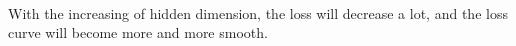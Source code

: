 \documentclass[twoside]{article}
\begin{document}
\begin{figure}[h]
{\begin{minipage}[b]{0.4\textwidth}
\end{minipage}
}
\end{figure}
\paragraph{} With the increasing of hidden dimension, the loss will decrease a lot, and the loss curve will become more and more smooth.
\end{document}
